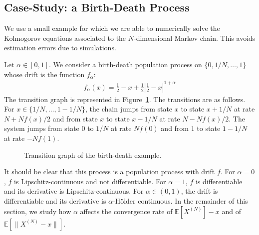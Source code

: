 \documentclass[acmlarge]{acmart}
\newcommand\XN{X^{(N)}}
\newcommand\sesp[1]{\mathbb{E}[#1]}
\newcommand\snorm[1]{\|#1\|}
\newcommand\abs[1]{\left|#1\right|}
\begin{document}
\subsection{Case-Study: a Birth-Death Process}

We use a small example for which we are able to numerically solve the
Kolmogorov equations associated to the $N$-dimensional Markov
chain. This avoids estimation errors due to simulations.

Let $\alpha\in[0,1]$. We consider a birth-death population process on
$\{0,1/N,\dots,1\}$ whose drift is the function $f_\alpha$:
\begin{align*}
  f_\alpha(x) = 
  \frac12-x + \frac12\abs{\frac12-x}^{1+\alpha} 
\end{align*}
The transition graph is represented in Figure~\ref{fig:BD_graph}.  The
transitions are as follows. For $x\in\{1/N,\dots,1-1/N\}$, the chain
jumps from state $x$ to state $x+1/N$ at rate $N+Nf(x)/2$ and from
state $x$ to state $x-1/N$ at rate $N-Nf(x)/2$. The system jumps from
state $0$ to $1/N$ at rate $Nf(0)$ and from $1$ to state $1-1/N$ at
rate $-Nf(1)$.
\begin{figure}[ht]
  \caption{Transition graph of the birth-death example. }
  \label{fig:BD_graph}
\end{figure}

It should be clear that this process is a population process with
drift $f$.  For $\alpha=0$, $f$ is Lipschitz-continuous and not
differentiable. For $\alpha=1$, $f$ is differentiable and its
derivative is Lipschitz-continuous. For $\alpha\in(0,1)$, the drift is
differentiable and its derivative is $\alpha$-Hölder
continuous. 
In the remainder of this section, we study how $\alpha$ affects the
convergence rate of $\sesp{\XN}-x$ and of $\sesp{\snorm{\XN-x}}$.
\end{document}
